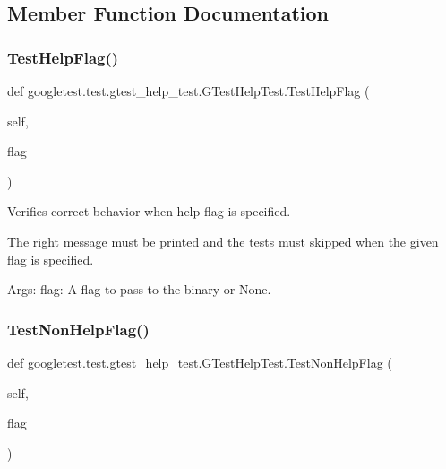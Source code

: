 \subsection{Member Function Documentation}
\mbox{\label{classgoogletest_1_1test_1_1gtest__help__test_1_1_g_test_help_test_add0dd2829d71ef1a175417f9a1d99994}} 
\subsubsection{\texorpdfstring{TestHelpFlag()}{TestHelpFlag()}}
{\footnotesize\ttfamily def googletest.\+test.\+gtest\+\_\+help\+\_\+test.\+G\+Test\+Help\+Test.\+Test\+Help\+Flag (\begin{DoxyParamCaption}\item[{}]{self,  }\item[{}]{flag }\end{DoxyParamCaption})}

\begin{DoxyVerb}Verifies correct behavior when help flag is specified.

The right message must be printed and the tests must
skipped when the given flag is specified.

Args:
  flag:  A flag to pass to the binary or None.
\end{DoxyVerb}
 \mbox{\label{classgoogletest_1_1test_1_1gtest__help__test_1_1_g_test_help_test_ae014ead1c8618e4a1f1b5796831b3d33}} 
\subsubsection{\texorpdfstring{TestNonHelpFlag()}{TestNonHelpFlag()}}
{\footnotesize\ttfamily def googletest.\+test.\+gtest\+\_\+help\+\_\+test.\+G\+Test\+Help\+Test.\+Test\+Non\+Help\+Flag (\begin{DoxyParamCaption}\item[{}]{self,  }\item[{}]{flag }\end{DoxyParamCaption})}

